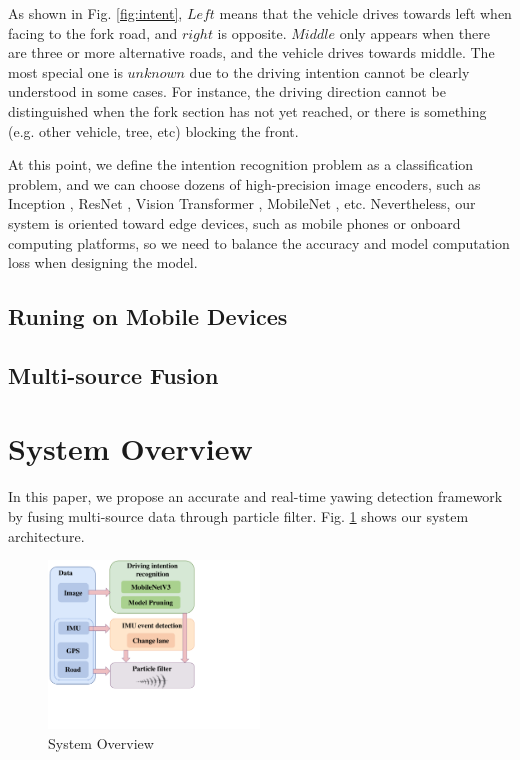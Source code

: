 \documentclass[journal]{IEEEtran}
\begin{document}
As shown in Fig. \ref{fig:intent}, $Left$ means that the vehicle drives towards left when facing to the fork road, and $right$ is opposite. $Middle$ only appears when there are three or more alternative roads, and the vehicle drives towards middle. The most special one is $unknown$ due to the driving intention cannot be clearly understood in some cases. For instance, the driving direction cannot be distinguished when the fork section has not yet reached, or there is something (e.g. other vehicle, tree, etc) blocking the front.

At this point, we define the intention recognition problem as a classification problem, and we can choose dozens of high-precision image encoders, such as Inception \cite{inceptionv3}, ResNet \cite{he2016deep}, Vision Transformer \cite{vit}, MobileNet \cite{mobilenetv3}, etc.
Nevertheless, our system is oriented toward edge devices, such as mobile phones or onboard computing platforms, so we need to balance the accuracy and model computation loss when designing the model.

\subsection{Runing on Mobile Devices}

\subsection{Multi-source Fusion}

\section{System Overview}\label{sec:overview}
In this paper, we propose an accurate and real-time yawing detection framework by fusing multi-source data through particle filter. 
Fig. \ref{fig:SystemOverview} shows our system architecture.

\begin{figure}[htbp]
    \centerline{\includegraphics[width=0.5\textwidth]{fig/SystemOverview1.pdf}}
    \caption{System Overview}
    \label{fig:SystemOverview}
\end{figure}
\end{document}
